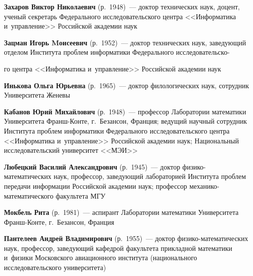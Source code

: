 \begin{multicols}{2}
\vspace*{3pt}

\noindent
\textbf{Захаров Виктор Николаевич} (р.\ 1948)~---
 доктор технических наук, доцент, ученый секретарь Федерального исследовательского 
 центра <<Информатика и~управ\-ле\-ние>> Российской академии наук
 
 \vspace*{3pt}

 \noindent
\textbf{Зацман Игорь Mоисеевич} (р.\ 1952)~--- 
доктор технических наук, заведующий отделом Института проб\-лем информатики 
Федерального исследовательско-\linebreak\vspace*{-12pt}

\columnbreak

\noindent
го центра <<Информатика и~управ\-ле\-ние>> 
Российской академии наук

\vspace*{3pt}

\noindent
\textbf{Инькова Ольга Юрьевна} (р.\ 1965)~--- доктор филологических наук, 
сотрудник Университета Женевы 

\vspace*{3pt}

 \noindent
\textbf{Кабанов Юрий Михайлович} (р.\ 1948)~--- профессор Лаборатории математики 
Университета Франш-Кон\-те, г.~Безансон, Франция; 
ведущий научный сотрудник Института проб\-лем информатики Федерального 
исследовательского центра <<Информатика и~управ\-ле\-ние>> Российской академии наук;
 Национальный исследовательский университет <<МЭИ>>
 
 \vspace*{3pt}
 

\noindent
\textbf{Любецкий Василий Александрович} (р.\ 1945)~--- 
доктор фи\-зи\-ко-ма\-те\-ма\-ти\-че\-ских наук, профессор, заведующий 
лабораторией Института проб\-лем передачи информации Российской академии наук; 
профессор ме\-ха\-ни\-ко-ма\-те\-ма\-ти\-че\-ско\-го факультета МГУ

\vspace*{3pt}

\noindent
\textbf{Мокбель Рита} (р.\ 1981)~---
 аспирант Лаборатории математики Университета Франш-Кон\-те, г.~Безансон, Франция
 
 \vspace*{3pt}
 

\noindent
\textbf{Пантелеев Андрей Владимирович} (р.\ 1955)~---
 доктор фи\-зи\-ко-ма\-те\-ма\-ти\-че\-ских наук, профессор, заведующий кафедрой 
 факультета прикладной математики и~физики Московского авиационного института 
 (национального исследовательского университета)
 

\end{multicols}
